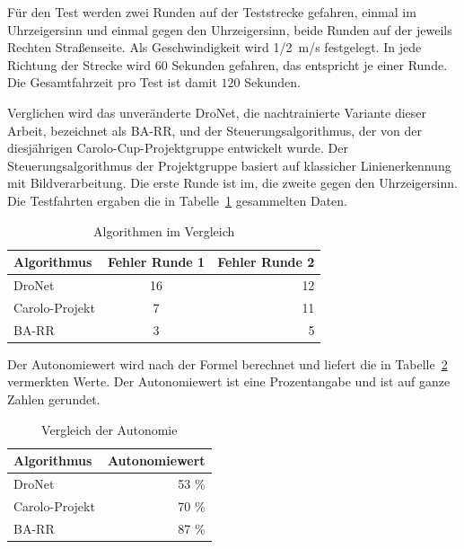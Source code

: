 Für den Test werden zwei Runden auf der Teststrecke gefahren, einmal im Uhrzeigersinn und einmal gegen den Uhrzeigersinn, beide Runden auf der jeweils Rechten Straßenseite. Als Geschwindigkeit wird \SI{1/2}{\meter/\second} festgelegt. In jede Richtung der Strecke wird $60$ Sekunden gefahren, das entspricht je einer Runde. Die Gesamtfahrzeit pro Test ist damit $120$ Sekunden.

Verglichen wird das unveränderte DroNet, die nachtrainierte Variante dieser Arbeit, bezeichnet als BA-RR, und der Steuerungsalgorithmus, der von der diesjährigen Carolo-Cup-Projektgruppe entwickelt wurde. Der Steuerungsalgorithmus der Projektgruppe basiert auf klassicher Linienerkennung mit Bildverarbeitung. Die erste Runde ist im, die zweite gegen den Uhrzeigersinn. Die Testfahrten ergaben die in Tabelle~\ref{tab:testfahrten} gesammelten Daten.



\begin{table}[h]
  \begin{center}
    \caption{Algorithmen im Vergleich}
    \label{tab:testfahrten}
    \begin{tabular}{l|c|r} %
      \textbf{Algorithmus} & \textbf{Fehler Runde 1} & \textbf{Fehler Runde 2}\\
      \hline
      DroNet & 16 & 12\\
      Carolo-Projekt & 7 & 11\\
       BA-RR& 3 & 5\\
    \end{tabular}
  \end{center}
\end{table}

Der Autonomiewert wird nach der Formel berechnet und liefert die in Tabelle~\ref{tab:autonomie} vermerkten Werte. Der Autonomiewert ist eine Prozentangabe und ist auf ganze Zahlen gerundet.

\begin{table}[h]
  \begin{center}
    \caption{Vergleich der Autonomie}
    \label{tab:autonomie}
    \begin{tabular}{l|r}
      \textbf{Algorithmus} & \textbf{Autonomiewert} \\
      \hline
      DroNet & 53 \% \\
      Carolo-Projekt & 70 \%  \\
       BA-RR& 87 \% \\
    \end{tabular}
  \end{center}
\end{table}

